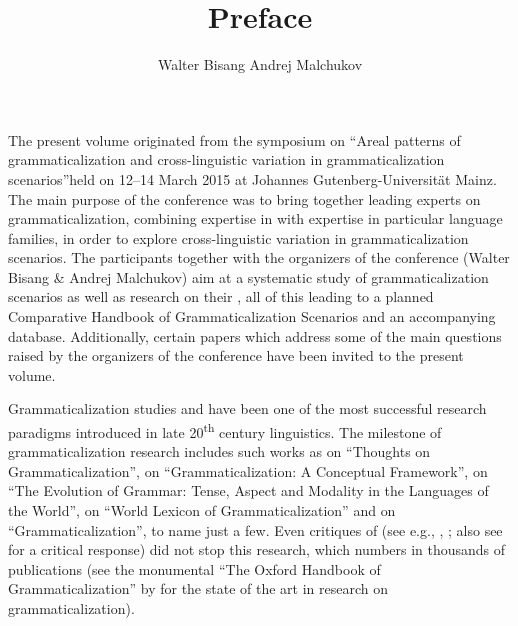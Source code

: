 \documentclass[output=paper]{LSP/langsci}
\title{Preface}
\author{Walter Bisang \lastand Andrej Malchukov\affiliation{Johannes Gutenberg-Universität Mainz}}
\begin{document}
\noindent The present volume originated from the symposium on “Areal patterns of grammaticalization and cross-linguistic variation in grammaticalization scenarios”\linebreak held on 12--14 March 2015 at Johannes Gutenberg-Universität Mainz. The main purpose of the conference was to bring together leading experts on grammaticalization, combining expertise in  with expertise in particular language families, in order to explore cross-linguistic variation in grammaticalization scenarios. The participants together with the organizers of the conference (Walter Bisang \& Andrej Malchukov) aim at a systematic study of grammaticalization scenarios as well as research on their , all of this leading to a planned Comparative Handbook of Grammaticalization Scenarios and an accompanying database. Additionally, certain papers which address some of the main questions raised by the organizers of the conference have been invited to the present volume.

Grammaticalization studies and  have been one of the most successful research paradigms introduced in late 20\textsuperscript{th} century linguistics. The milestone of grammaticalization research includes such works as \citet{Lehmann2015Thoughts} on “Thoughts on Grammaticalization”, \citet{HeineEtAl1991} on “Grammaticalization: A Conceptual Framework”, \citet{BybeeEtAl1994} on “The Evolution of Grammar: Tense, Aspect and Modality in the Languages of the World”, \citet{Heine2002} on “World Lexicon of Grammaticalization” and \citet{Hopper2003} on “Grammaticalization”, to name just a few. Even critiques of  (see e.g., \citealt{Newmeyer1998},  \citealt{Campbell2001}; also see \citealt{Lehmann2004Theory} for a critical response) did not stop this research, which numbers in thousands of publications (see the monumental “The Oxford Handbook of Grammaticalization” by \citealt{Narrog2011} for the state of the art in research on grammaticalization). 
\end{document}
